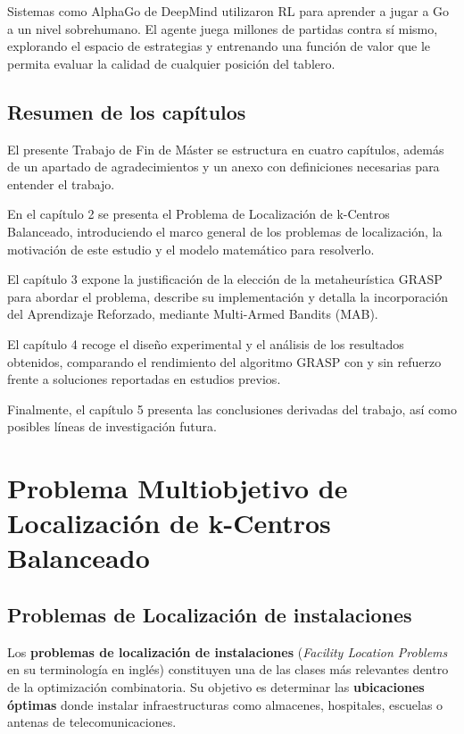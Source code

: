 \documentclass[12pt,a4paper]{book}
\begin{document}
Sistemas como AlphaGo \cite{AlphaGo} de DeepMind utilizaron RL para aprender a jugar a Go a un nivel sobrehumano.
El agente juega millones de partidas contra sí mismo, explorando el espacio de estrategias y entrenando una función de valor que le permita evaluar la calidad de cualquier posición del tablero.


\section{Resumen de los capítulos}
El presente Trabajo de Fin de Máster se estructura en cuatro capítulos, además de un apartado de agradecimientos y un anexo con definiciones necesarias para entender el trabajo.

En el capítulo 2 se presenta el Problema de Localización de k-Centros Balanceado, introduciendo el marco general de los problemas de localización, la motivación de este estudio y el modelo matemático para resolverlo.

El capítulo 3 expone la justificación de la elección de la metaheurística GRASP para abordar el problema, describe su implementación y detalla la incorporación del Aprendizaje Reforzado, mediante Multi-Armed Bandits (MAB).

El capítulo 4 recoge el diseño experimental y el análisis de los resultados obtenidos, comparando el rendimiento del algoritmo GRASP con y sin refuerzo frente a soluciones reportadas en estudios previos.

Finalmente, el capítulo 5 presenta las conclusiones derivadas del trabajo, así como posibles líneas de investigación futura.

\chapter{Problema Multiobjetivo de Localización de k-Centros Balanceado}

\section{Problemas de Localización de instalaciones}

Los \textbf{problemas de localización de instalaciones} (\textit{Facility Location Problems} en su terminología en inglés) constituyen una de las clases más relevantes dentro de la optimización combinatoria. Su objetivo es determinar las \textbf{ubicaciones óptimas} donde instalar infraestructuras como almacenes, hospitales, escuelas o antenas de telecomunicaciones.
\end{document}
